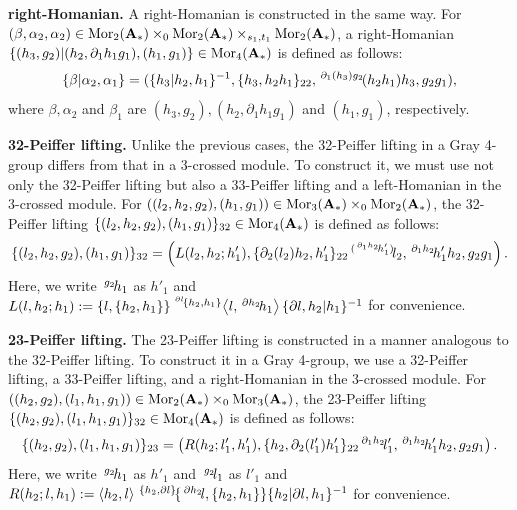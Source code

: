 \documentclass[11pt, reqno]{amsart} %
\newcommand{\act}[1]{\,\sp{#1}\!}
\newcommand{\del}{\partial}
\newcommand{\mor}{{\mathop{\mathrm{Mor}}}}
\theoremstyle{definition}
\theoremstyle{remark}
\numberwithin{equation}{section}
\begin{document}
\vspace{.5em}
\noindent
{\bf right-Homanian.} A right-Homanian is constructed in the same way. For $(\beta,\alpha_2,\alpha_2)\in \mor_2({\bf A_*}) \times_0 \mor_2({\bf A_*}) \times_{s_1,t_1} \mor_2({\bf A_*}) $, a right-Homanian $\{(h_3, g_2)|(h_2, \del_1 h_1 g_1), (h_1, g_1)\} \in \mor_4({\bf A_*})$ is defined as follows:
\[
\{\beta|\alpha_2, \alpha_1\} = (\{h_3| h_2, h_1\}^{-1},\{h_3, h_2h_1\}_{22},\act{\del_1(h_3)g_2}(h_2h_1)h_3,g_2g_1),
\]
where $\beta,\alpha_2$ and $\beta_1$ are $(h_3, g_2),(h_2, \del_1 h_1 g_1)$ and $(h_1, g_1)$, respectively.

\vspace{.5em}
\noindent
{\bf 32-Peiﬀer lifting.} Unlike the previous cases, the 32-Peiﬀer lifting in a Gray 4-group differs from that in a 3-crossed module. To construct it, we must use not only the 32-Peiﬀer lifting but also a 33-Peiﬀer lifting and a left-Homanian in the 3-crossed module. For $((l_2, h_2, g_2),(h_1,g_1))\in \mor_3({\bf A_*}) \times_0\mor_2({\bf A_*})$, the 32-Peiffer lifting $\{(l_2, h_2, g_2),(h_1,g_1)\}_{32} \in \mor_4({\bf A_*})$ is defined as follows:
\[
\{(l_2, h_2, g_2),(h_1,g_1)\}_{32} = \left(L(l_2, h_2; h'_1), \{\del_2(l_2)h_2,h'_1\}_{22}\act{(\act{\del_1 h_2}h'_1)}l_2, \act{\del_1 h_2}h'_1 h_2, g_2g_1 \right).
\]
Here, we write $\act{g_2}h_1$ as $h'_1$ and $L(l,h_2;h_1) := \{l,\{h_2,h_1\}\}\act{\act{\partial l}\{h_2,h_1\}}\left<l,\act{\partial h_2}h_1\right>\{\partial l,h_2|h_1\}^{-1}$ for convenience.

\vspace{.5em}
\noindent
{\bf 23-Peiﬀer lifting.} The 23-Peiﬀer lifting is constructed in a manner analogous to the 32-Peiffer lifting. To construct it in a Gray 4-group, we use a 32-Peiﬀer lifting, a 33-Peiﬀer lifting, and a right-Homanian in the 3-crossed module. For $((h_2, g_2),(l_1,h_1,g_1))\in \mor_2({\bf A_*}) \times_0\mor_3({\bf A_*})$, the 23-Peiffer lifting $\{( h_2, g_2),(l_1,h_1,g_1)\}_{32} \in \mor_4({\bf A_*})$ is defined as follows:
\[
\{(h_2, g_2),(l_1, h_1,g_1)\}_{23} = \left(R(h_2; l'_1, h'_1), \{h_2,\del_2(l'_1)h'_1\}_{22}\act{\del_1 h_2}l'_1, \act{\del_1 h_2}h'_1 h_2, g_2g_1  \right).
\]
Here, we write $\act{g_2}h_1$ as $h'_1$ and $\act{g_2}l_1$ as $l'_1$ and $R(h_2;l,h_1) := \left<h_2,l\right>\act{\{h_2,\partial l\}}\{\act{\partial h_2}l,\{h_2,h_1\}\}\{h_2|\partial l,h_1\}^{-1}$ for convenience. 
\end{document}
